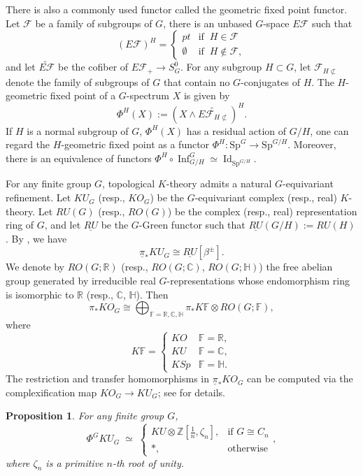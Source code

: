 \documentclass{amsart}
\theoremstyle{plain}
\newtheorem{proposition}[theorem]{Proposition}
\theoremstyle{definition}
\theoremstyle{remark}
\begin{document}
There is also a commonly used functor called the geometric fixed point functor. Let $\mathcal{F}$ be a family of subgroups of $G$, there is an unbased $G$-space $E\mathcal{F}$ such that 
    \[
    (E\mathcal{F})^H=\begin{cases}
        pt &  \text{if }\ H\in\mathcal{F}\\
        \emptyset &  \text{if }\ H\not\in\mathcal{F},
    \end{cases}
    \]
and let $\widetilde{E\mathcal{F}}$ be the cofiber of $E\mathcal{F}_+\to S^0_G$. For any subgroup $H\subset G$, let $\mathcal{F}_{H\not\subset}$ denote the family of subgroups of $G$ that contain no $G$-conjugates of $H$. The $H$-geometric fixed point of a $G$-spectrum $X$ is given by 
\[
\Phi^H(X):=(X\wedge \widetilde{E\mathcal{F}_{H\not\subset}})^H.
\]
If $H$ is a normal subgroup of $G$, $\Phi^H(X)$ has a residual action of $G/H$, one can regard the $H$-geometric fixed point as a functor $\Phi^H:\mathrm{Sp}^G\to \mathrm{Sp}^{G/H}$. Moreover, there is an equivalence of functors $\Phi^H\circ \operatorname{Inf}_{G/H}^G\simeq \operatorname{Id}_{\mathrm{Sp}^{G/H}}$.

For any finite group $G$, topological $K$-theory admits a natural $G$-equivariant refinement. Let $KU_G$ (resp., $KO_G$) be the $G$-equivariant complex (resp., real) $K$-theory. Let $RU(G)$ (resp., $RO(G)$) be the complex (resp., real) representation ring of $G$, and let $\underline{RU}$ be the $G$-Green functor such that $\underline{RU}(G/H):=RU(H)$. By \cite[Proposition 2.2]{segal1968equivariant}, we have
\[
\underline{\pi}_* KU_G\cong \underline{RU}[\beta^{\pm}].
\]
We denote by $RO(G;\mathbb{R})$ (resp., $RO(G;\mathbb{C})$, $RO(G;\mathbb{H})$) the free abelian group generated by irreducible real $G$-representations whose endomorphism ring is isomorphic to $\mathbb{R}$ (resp., $\mathbb{C}$, $\mathbb{H}$). Then 
\[
\pi_* KO_G \cong \bigoplus_{\mathbb{F}=\mathbb{R},\mathbb{C},\mathbb{H}}\pi_*K\mathbb{F}\otimes RO(G;\mathbb{F}),
\]
where
\[
K\mathbb{F}=\begin{cases}
    KO & \mathbb{F}=\mathbb{R},\\
    KU & \mathbb{F}=\mathbb{C},\\
    KSp & \mathbb{F}=\mathbb{H}.
\end{cases}
\]
The restriction and transfer homomorphisms in $\underline{\pi}_* KO_G$ can be computed via the complexification map $KO_G\to KU_G$; see \cite[Section 9.1]{mathew2017nilpotence} for details.

    \begin{proposition}\cite[Proposition 7.7.7]{dieck2006transformation}\label{prop:geometric fixed KU}
    For any finite group $G$, 
    $$\Phi^{G} KU_{G}\;\simeq\;
        \begin{cases}
            KU\otimes \mathbb{Z}\left[\frac{1}{n},\zeta_{n}\right], & \text{if } G \cong C_{n}\\[6pt]
            \ast, & \text{otherwise}
        \end{cases},$$
        where $\zeta_n$ is a primitive $n$-th root of unity.
    \end{proposition}
\end{document}
